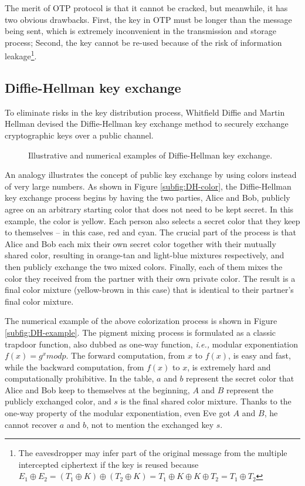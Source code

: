 \documentclass{easyclass}
\begin{document}
The merit of OTP protocol is that it cannot be cracked, but meanwhile, it has two obvious drawbacks. First, the key in OTP must be longer than the message being sent, which is extremely inconvenient in the transmission and storage process; Second, the key cannot be re-used because of the risk of information leakage\footnote{The eavesdropper may infer part of the original message from the multiple intercepted ciphertext if the key is reused because $E_1\oplus E_2=(T_1\oplus K)\oplus (T_2\oplus K)=T_1\oplus K\oplus K\oplus T_2=T_1\oplus T_2$}. 

\subsection{Diffie-Hellman key exchange}
To eliminate risks in the key distribution process, Whitfield Diffie and Martin Hellman devised the Diffie-Hellman key exchange method to securely exchange cryptographic keys over a public channel.  

\begin{figure}[h]
	\centering
	\hspace{0.05\textwidth}
	\caption{Illustrative and numerical examples of Diffie-Hellman key exchange.}
	\label{fig:DH}
\end{figure}

An analogy illustrates the concept of public key exchange by using colors instead of very large numbers. As shown in Figure \ref{subfig:DH-color}, the Diffie-Hellman key exchange process begins by having the two parties, Alice and Bob, publicly agree on an arbitrary starting color that does not need to be kept secret. In this example, the color is yellow. Each person also selects a secret color that they keep to themselves – in this case, red and cyan. The crucial part of the process is that Alice and Bob each mix their own secret color together with their mutually shared color, resulting in orange-tan and light-blue mixtures respectively, and then publicly exchange the two mixed colors. Finally, each of them mixes the color they received from the partner with their own private color. The result is a final color mixture (yellow-brown in this case) that is identical to their partner's final color mixture.

The numerical example of the above colorization process is shown in Figure  \ref{subfig:DH-example}. The pigment mixing process is formulated as a classic trapdoor function, also dubbed as one-way function, \textit{i.e.,} modular exponentiation $f(x)=g^x mod p$. The forward computation, from $x$ to $f(x)$, is easy and fast, while the backward computation, from $f(x)$ to $x$, is extremely hard and computationally prohibitive. In the table, $a$ and $b$ represent the secret color that Alice and Bob keep to themselves at the beginning, $A$ and $B$ represent the publicly exchanged color, and $s$ is the final shared color mixture. Thanks to the one-way property of the modular exponentiation, even Eve got $A$ and $B$, he cannot recover $a$ and $b$, not to mention the exchanged key $s$.
\end{document}
